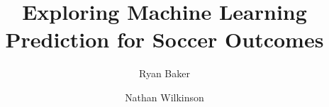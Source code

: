 \documentclass[sigconf]{acmart}
\begin{document}
\title{Exploring Machine Learning Prediction for Soccer Outcomes}


\author{Ryan Baker}

\author{Nathan Wilkinson}


\begin{abstract}
 
\end{abstract}

\maketitle




 
\end{document}
